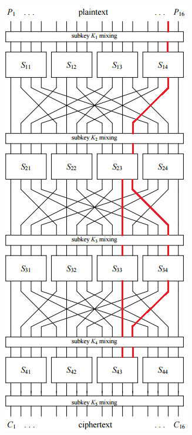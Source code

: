 \documentclass[british,10pt,a4paper]{article}
\begin{document}
\begin{appendices}
  \includegraphics{2,48}

\end{appendices}
\end{document}
